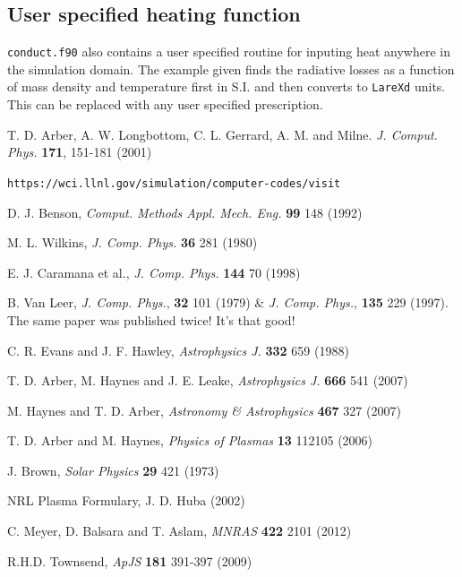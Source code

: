 \documentclass[11pt]{article}
\begin{document}
\subsection*{User specified heating function}
{\tt conduct.f90} also contains a user specified routine for inputing heat anywhere in the simulation domain. 
The example given finds the radiative losses as a function of mass density and temperature first in S.I. and 
then converts to {\tt LareXd} units. This can be replaced with any user specified prescription.


\newpage
\begin{thebibliography}{}

 T. D. Arber, A. W. Longbottom, C. L. Gerrard, A. M. and Milne. \textit{J. Comput. Phys.} \textbf{171}, 151-181 (2001)

 \texttt{https://wci.llnl.gov/simulation/computer-codes/visit}

 D. J. Benson, \textit{Comput. Methods Appl. Mech. Eng.} \textbf{99} 148 (1992)

 M. L. Wilkins, \textit{J. Comp. Phys.} \textbf{36} 281 (1980)

 E. J. Caramana et al., \textit{J. Comp. Phys.} \textbf{144} 70 (1998)

 B. Van Leer, \textit{J. Comp. Phys.}, \textbf{32} 101 (1979)  \& \textit{J. Comp. Phys.}, \textbf{135} 229 (1997). 
The same paper was published twice! It's that good!

 C. R. Evans and J. F. Hawley, \textit{Astrophysics J.} \textbf{332} 659 (1988)

 T. D. Arber, M. Haynes and J. E. Leake, {\it Astrophysics J.} \textbf{666} 541 (2007)

 M. Haynes and T. D. Arber, \textit{Astronomy \& Astrophysics } \textbf{467} 327 (2007)

 T. D. Arber and M. Haynes, \textit{Physics of Plasmas} \textbf{13} 112105 (2006)

 J. Brown, \textit{Solar Physics} \textbf{29} 421 (1973)

 NRL Plasma Formulary, J. D. Huba (2002)

 C. Meyer, D. Balsara and T. Aslam, \textit{MNRAS} \textbf{422} 2101 (2012)

 R.H.D. Townsend, \textit{ApJS} \textbf{181} 391-397 (2009)

\end{thebibliography}
\end{document}
